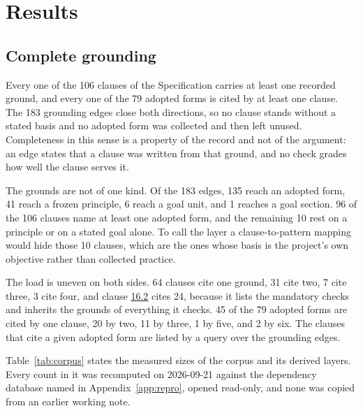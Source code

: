 \section{Results}\label{sec:results}

\subsection{Complete grounding}

Every one of the 106 clauses of the Specification carries at least one recorded ground, and every one of the 79 adopted forms is cited by at least one clause. The 183 grounding edges close both directions, so no clause stands without a stated basis and no adopted form was collected and then left unused. Completeness in this sense is a property of the record and not of the argument: an edge states that a clause was written from that ground, and no check grades how well the clause serves it.

The grounds are not of one kind. Of the 183 edges, 135 reach an adopted form, 41 reach a frozen principle, 6 reach a goal unit, and 1 reaches a goal section. 96 of the 106 clauses name at least one adopted form, and the remaining 10 rest on a principle or on a stated goal alone. To call the layer a clause-to-pattern mapping would hide those 10 clauses, which are the ones whose basis is the project's own objective rather than collected practice.

The load is uneven on both sides. 64 clauses cite one ground, 31 cite two, 7 cite three, 3 cite four, and clause \hyperlink{nss-16.2}{16.2} cites 24, because it lists the mandatory checks and inherits the grounds of everything it checks. 45 of the 79 adopted forms are cited by one clause, 20 by two, 11 by three, 1 by five, and 2 by six. The clauses that cite a given adopted form are listed by a query over the grounding edges.

Table~\ref{tab:corpus} states the measured sizes of the corpus and its derived layers. Every count in it was recomputed on 2026-09-21 against the dependency database named in Appendix~\ref{app:repro}, opened read-only, and none was copied from an earlier working note.

